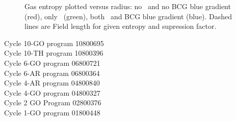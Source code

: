 \documentclass[letterpaper,11pt]{article}
\begin{document}
\begin{center}
\begin{figure}[htp]
  \caption{Gas entropy plotted versus radius: no \halpha\ and no
    BCG blue gradient (red), only \halpha\ (green), both
    \halpha\ and BCG blue gradient (blue). Dashed lines are Field
    length for given entropy and supression factor.}
  \label{fig:cond}
\end{figure}
\end{center}

\onecolumn
\large
\begin{center}
\end{center}
\normalsize
\noindent

\large
\begin{center}
\end{center}
\normalsize
\noindent
Cycle 10-GO program 10800695\\
Cycle 10-TH program 10800396\\
Cycle 6-GO program 06800721\\
Cycle 6-AR program 06800364\\
Cycle 4-AR program 04800840\\
Cycle 4-GO program 04800327\\
Cycle 2 GO Program 02800376\\
Cycle 1-GO program 01800448
\end{document}
